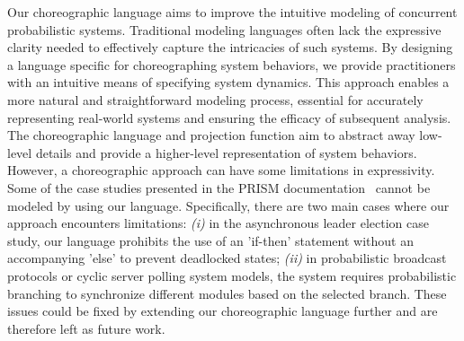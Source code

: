Our choreographic language aims to improve the intuitive modeling of concurrent probabilistic systems. Traditional modeling languages often lack the expressive clarity needed to effectively capture the intricacies of such systems. By designing a language specific for choreographing system behaviors, we provide practitioners with an intuitive means of specifying system dynamics. This approach enables a more natural and straightforward modeling process, essential for accurately representing real-world systems and ensuring the efficacy of subsequent analysis.
%
The choreographic language and projection function aim to abstract
away low-level details and provide a higher-level representation of
system behaviors. 
However, a choreographic approach can have some limitations in
expressivity. Some of the case studies presented in the PRISM
documentation~\cite{PRISMdoc} cannot be modeled by using our
language. Specifically, there are two main cases where our approach
encounters limitations:
%
\textit{(i)} in the asynchronous leader election case study, our language prohibits the use of an 'if-then' statement without an accompanying 'else' to prevent deadlocked states; 
%
\textit{(ii)} in probabilistic broadcast protocols or cyclic server polling system models, the system requires probabilistic branching to synchronize different modules based on the selected branch.
%
These issues could be fixed by extending our choreographic language
further and are therefore left as future work.

